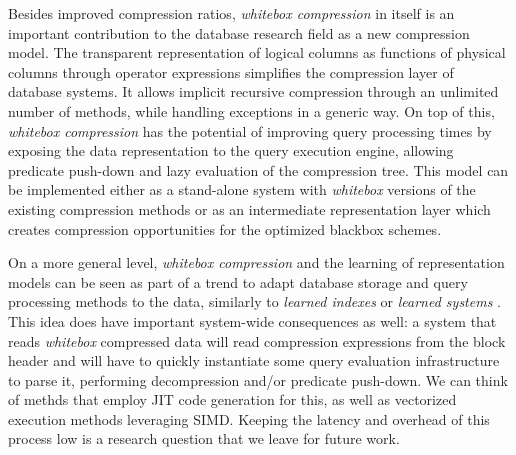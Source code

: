 \noindent
Besides improved compression ratios, \textit{whitebox compression} in itself is an important contribution to the database research field as a new compression model. The transparent representation of logical columns as functions of physical columns through operator expressions simplifies the compression layer of database systems. It allows implicit recursive compression through an unlimited number of methods, while handling exceptions in a generic way. On top of this, \textit{whitebox compression} has the potential of improving query processing times by exposing the data representation to the query execution engine, allowing predicate push-down and lazy evaluation of the compression tree. This model can be implemented either as a stand-alone system with \textit{whitebox} versions of the existing compression methods or as an intermediate representation layer which creates compression opportunities for the optimized blackbox schemes.

On a more general level, \textit{whitebox compression} and the learning of representation models can be seen as part of a trend to adapt database storage and query processing methods to the data, similarly to \textit{learned indexes} \cite{kraska2018case} or \textit{learned systems} \cite{idreos2019auto,kraska2019sagedb}. This idea does have important system-wide consequences as well: a system that reads \textit{whitebox} compressed data will read compression expressions from the block header and will have to quickly instantiate some query evaluation infrastructure to parse it, performing decompression and/or predicate push-down. We can think of methds that employ JIT code generation for this, as well as vectorized execution methods leveraging SIMD. Keeping the latency and overhead of this process low is a research question that we leave for future work.

